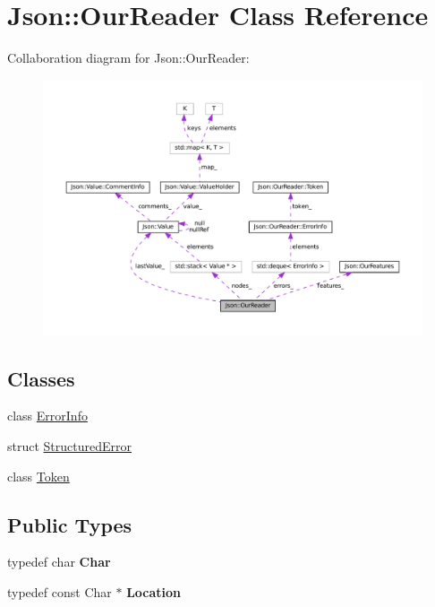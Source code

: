 \hypertarget{classJson_1_1OurReader}{}\section{Json\+:\+:Our\+Reader Class Reference}
\label{classJson_1_1OurReader}


Collaboration diagram for Json\+:\+:Our\+Reader\+:
\nopagebreak
\begin{figure}[H]
\begin{center}
\leavevmode
\includegraphics[width=350pt]{classJson_1_1OurReader__coll__graph}
\end{center}
\end{figure}
\subsection*{Classes}
\begin{DoxyCompactItemize}
\item 
class \hyperlink{classJson_1_1OurReader_1_1ErrorInfo}{Error\+Info}
\item 
struct \hyperlink{structJson_1_1OurReader_1_1StructuredError}{Structured\+Error}
\item 
class \hyperlink{classJson_1_1OurReader_1_1Token}{Token}
\end{DoxyCompactItemize}
\subsection*{Public Types}
\begin{DoxyCompactItemize}
\item 
\mbox{\label{classJson_1_1OurReader_a0cd0bab4caa66594ab843ccd5f9dc239}} 
typedef char {\bfseries Char}
\item 
\mbox{\label{classJson_1_1OurReader_a1bdc7bbc52ba87cae6b19746f2ee0189}} 
typedef const Char $\ast$ {\bfseries Location}
\end{DoxyCompactItemize}
